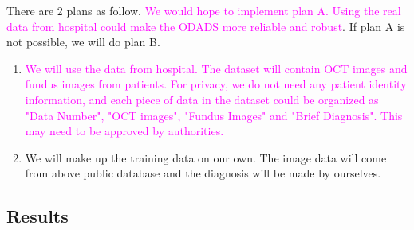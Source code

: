 \documentclass{article}
\begin{document}
		There are 2 plans as follow.  \textcolor{magenta}{We would hope to implement plan A.  Using the real data from hospital could make the ODADS more reliable and robust}.  If plan A is not possible, we will do plan B.
		\vspace{0.1cm}
		\begin{enumerate}
			\vspace{-0.2cm}
			\item \textcolor{magenta}{We will use the data from hospital.  The dataset will contain OCT images and fundus images from patients.  For privacy, we do not need any patient identity information, and each piece of data in the dataset could be organized as "Data Number", "OCT images", "Fundus Images" and "Brief Diagnosis".  This may need to be approved by authorities.}
			\vspace{-0.2cm} 
			\item We will make up the training data on our own.  The image data will come from above public database and the diagnosis will be made by ourselves.
		\end{enumerate}	

	\subsection{Results} \label{sec:results}
	
\end{document}
